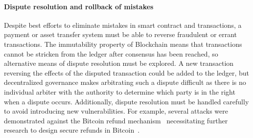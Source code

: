 
\paragraph{Dispute resolution and rollback of mistakes}
Despite best efforts to eliminate mistakes in smart contract and transactions, a payment or asset transfer system must be able to reverse fraudulent or errant transactions. The immutability property of Blockchain means that transactions cannot be stricken from the ledger after consensus has been reached, so alternative means of dispute resolution must be explored. A new transaction reversing the effects of the disputed transaction could be added to the ledger, but decentralized governance makes arbitrating such a dispute difficult as there is no individual arbiter with the authority to determine which party is in the right when a dispute occurs.  Additionally, dispute resolution must be handled carefully to avoid introducing new vulnerabilities.  For example, several attacks were demonstrated against the Bitcoin refund mechanism~\cite{FC:MccShaHao16} necessitating further research to design secure refunds in Bitcoin~\cite{arxiv:AviSafSha18}.

